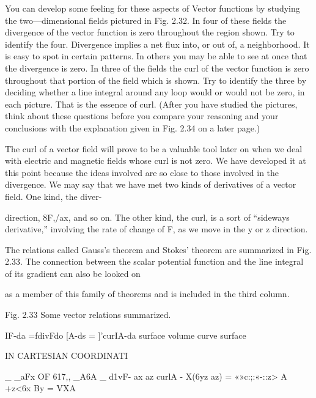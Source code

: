 You can develop some feeling for these aspects of Vector functions
by studying the two---dimensional fields pictured in Fig. 2.32. In four
of these fields the divergence of the vector function is zero throughout
the region shown. Try to identify the four. Divergence implies
a net flux into, or out of, a neighborhood. It is easy to spot in certain
patterns. In others you may be able to see at once that the divergence
is zero. In three of the fields the curl of the vector function is
zero throughout that portion of the field which is shown. Try to
identify the three by deciding whether a line integral around any
loop would or would not be zero, in each picture. That is the essence
of curl. (After you have studied the pictures, think about these questions
before you compare your reasoning and your conclusions with
the explanation given in Fig. 2.34 on a later page.)

The curl of a vector field will prove to be a valuable tool later on
when we deal with electric and magnetic fields whose curl is not zero.
We have developed it at this point because the ideas involved are so
close to those involved in the divergence. We may say that we have
met two kinds of derivatives of a vector field. One kind, the diver-

direction, 8F,/ax, and so on. The other kind, the curl, is a sort of
``sideways derivative,'' involving the rate of change of F, as we move
in the y or z direction.

The relations called Gauss's theorem and Stokes' theorem are summarized
in Fig. 2.33. The connection between the scalar potential
function and the line integral of its gradient can also be looked on

as a member of this family of theorems and is included in the third
column.


Fig. 2.33 Some vector relations summarized.

 

IF-da =fdivFdo [A-ds = ]'curIA-da
surface volume curve surface

IN CARTESIAN COORDINATI

_ _aFx OF 617,, _A6A _%
d1vF- ax  az curlA - X(6yz az)
=  «»c:;:«-::z>
A %
+z<6x By
= VXA

\fi
